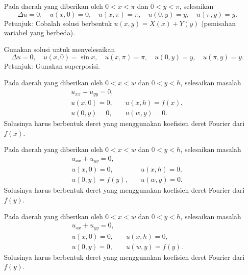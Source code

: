 \begin{exercise} \label{dirich:diffsepexr}
Pada daerah yang diberikan oleh $0 < x < \pi$ dan $0 < y < \pi$,
selesaikan
\begin{equation*}
\Delta u = 0,
\quad u(x,0) = 0,
\quad u(x,\pi) = \pi,
\quad u(0,y) = y,
\quad u(\pi,y) = y .
\end{equation*}
Petunjuk: Cobalah solusi berbentuk $u(x,y) = X(x) + Y(y)$ (pemisahan
variabel yang berbeda).
\end{exercise}

\begin{exercise}
Gunakan solusi  untuk menyelesaikan
\begin{equation*}
\Delta u = 0,
\quad u(x,0) = \sin x,
\quad u(x,\pi) = \pi,
\quad u(0,y) = y,
\quad u(\pi,y) = y .
\end{equation*}
Petunjuk: Gunakan superposisi.
\end{exercise}

\begin{exercise}
Pada daerah yang diberikan oleh $0 < x < w$ dan $0 < y < h$,
selesaikan masalah
\begin{equation*}
\begin{array}{ll}
u_{xx} + u_{yy} = 0, & \\
u(x,0) = 0, \quad & u(x,h) = f(x), \\
u(0,y) = 0, \quad & u(w,y) = 0.
\end{array}
\end{equation*}
Solusinya harus berbentuk deret yang menggunakan koefisien deret Fourier
dari $f(x)$.
\end{exercise}

\begin{exercise}
Pada daerah yang diberikan oleh $0 < x < w$ dan $0 < y < h$,
selesaikan masalah
\begin{equation*}
\begin{array}{ll}
u_{xx} + u_{yy} = 0, & \\
u(x,0) = 0, \quad & u(x,h) = 0, \\
u(0,y) = f(y), \quad & u(w,y) = 0.
\end{array}
\end{equation*}
Solusinya harus berbentuk deret yang menggunakan koefisien deret Fourier
dari $f(y)$.
\end{exercise}

\begin{exercise}
Pada daerah yang diberikan oleh $0 < x < w$ dan $0 < y < h$,
selesaikan masalah
\begin{equation*}
\begin{array}{ll}
u_{xx} + u_{yy} = 0, & \\
u(x,0) = 0, \quad & u(x,h) = 0, \\
u(0,y) = 0, \quad & u(w,y) = f(y).
\end{array}
\end{equation*}
Solusinya harus berbentuk deret yang menggunakan koefisien deret Fourier
dari $f(y)$.
\end{exercise}

